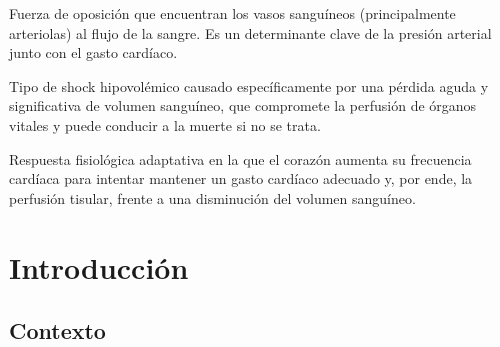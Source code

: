\documentclass[12pt, letterpaper]{article}
\begin{document}
\begin{description}[style=unboxed, leftmargin=0cm]
    \item[\textbf{Resistencia Periférica Total (RPT):}] Fuerza de oposición que encuentran los vasos sanguíneos (principalmente arteriolas) al flujo de la sangre. Es un determinante clave de la presión arterial junto con el gasto cardíaco.
    
    \item[\textbf{Shock hemorrágico:}] Tipo de shock hipovolémico causado específicamente por una pérdida aguda y significativa de volumen sanguíneo, que compromete la perfusión de órganos vitales y puede conducir a la muerte si no se trata.
    
    \item[\textbf{Taquicardia compensatoria:}] Respuesta fisiológica adaptativa en la que el corazón aumenta su frecuencia cardíaca para intentar mantener un gasto cardíaco adecuado y, por ende, la perfusión tisular, frente a una disminución del volumen sanguíneo.
\end{description}
\newpage

\listoftables
{}
\newpage


\section{Introducción}

\subsection{Contexto}
\end{document}
